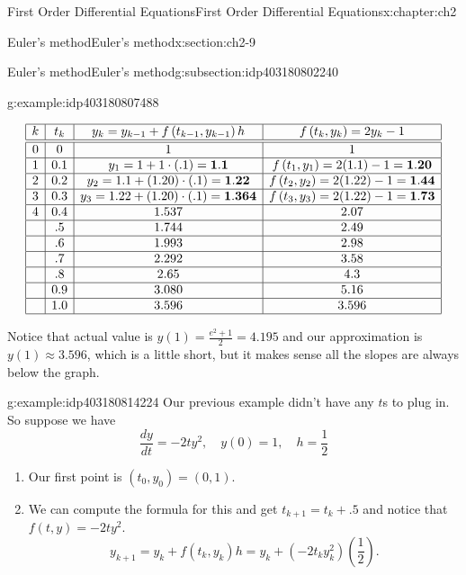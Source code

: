 \documentclass[oneside,10pt,]{book}
\numberwithin{equation}{section}
\numberwithin{equation}{section}
\newcommand{\amp}{&}
\begin{document}
\begin{chapterptx}{First Order Differential Equations}{}{First Order Differential Equations}{}{}{x:chapter:ch2}
\begin{sectionptx}{Euler's method}{}{Euler's method}{}{}{x:section:ch2-9}
\begin{subsectionptx}{Euler's method}{}{Euler's method}{}{}{g:subsection:idp403180802240}
\begin{example}{}{g:example:idp403180807488}
\begin{enumerate}
\begin{equation*}
\begin{array}{|c|c|c|c|}
\hline
k \amp t_{k} \amp y_{k}=y_{k-1}+f\left(t_{k-1},y_{k-1}\right)h \amp f\left(t_{k},y_{k}\right)=2y_{k}-1\\
\hline
\hline
0 \amp 0 \amp 1 \amp 1\\
\hline
1 \amp 0.1 \amp y_{1}=1+1\cdot(.1)=\mathbf{1.1} \amp f\left(t_{1},y_{1}\right)=2(1.1)-1=\mathbf{1.20}\\
\hline
2 \amp 0.2 \amp y_{2}=1.1+(1.20)\cdot(.1)=\mathbf{1.22} \amp f\left(t_{2},y_{2}\right)=2(1.22)-1=\mathbf{1.44}\\
\hline
3 \amp 0.3 \amp y_{3}=1.22+(1.20)\cdot(.1)=\mathbf{1.364} \amp f\left(t_{3},y_{3}\right)=2(1.22)-1=\mathbf{1.73}\\
\hline
4 \amp 0.4 \amp 1.537 \amp 2.07\\
\hline
\amp .5 \amp 1.744 \amp 2.49\\
\hline
\amp .6 \amp 1.993 \amp 2.98\\
\hline
\amp .7 \amp 2.292 \amp 3.58\\
\hline
\amp .8 \amp 2.65 \amp 4.3\\
\hline
\amp 0.9 \amp 3.080 \amp 5.16\\
\hline
\amp 1.0 \amp 3.596 \amp 3.596\\
\hline
\end{array}
\end{equation*}
%
\end{enumerate}
Notice that actual value is \(y(1)=\frac{e^{2}+1}{2}=4.195\) and our approximation is \(y(1)\approx3.596\), which is a little short, but it makes sense all the slopes are always below the graph.%
\end{example}
\begin{example}{}{g:example:idp403180814224}%
Our previous example didn't have any \(t\)s to plug in. So suppose we have%
\begin{equation*}
\frac{dy}{dt}=-2ty^{2},\quad y(0)=1,\quad h=\frac{1}{2}
\end{equation*}
%
%
\begin{enumerate}
\item{}Our first point is \((t_{0},y_{0})=\left(0,1\right)\).%
\item{}We can compute the formula for this and get \(t_{k+1}=t_{k}+.5\) and notice that \(f\left(t,y\right)=-2ty^{2}\).%
\begin{equation*}
y_{k+1}=y_{k}+f\left(t_{k},y_{k}\right)h=y_{k}+\left(-2t_{k}y_{k}^{2}\right)(\frac{1}{2}).

\end{equation*}
\end{enumerate}
\end{example}
\end{subsectionptx}
\end{sectionptx}
\end{chapterptx}
\end{document}
